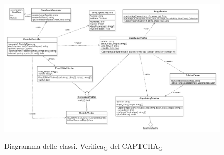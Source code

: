 
\begin{figure}[H]
	\centering
	\includegraphics[scale = 0.45]{img/verify.png}\\
	\caption{Diagramma delle classi. Verifica\textsubscript{G} del CAPTCHA\textsubscript{G}}
\end{figure}

